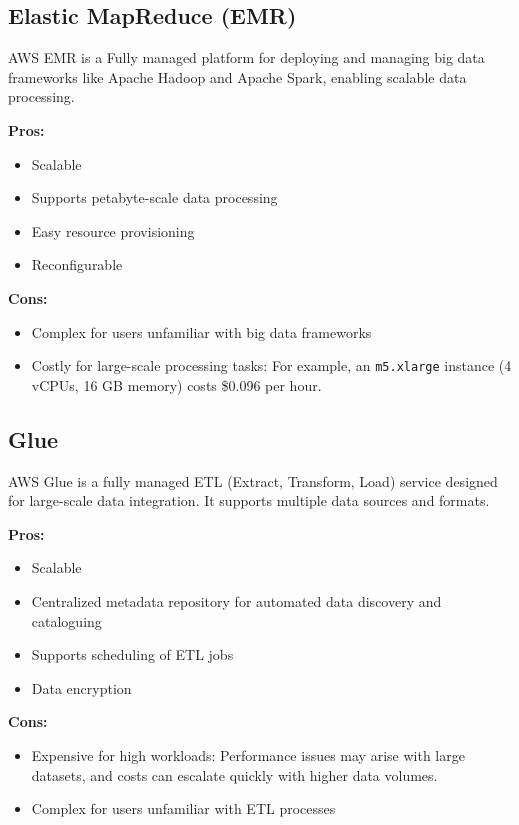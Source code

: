 \subsection*{Elastic MapReduce (EMR)}
\label{aws:emr}
AWS EMR is a Fully managed platform for deploying and managing big data frameworks like Apache Hadoop and Apache Spark, enabling scalable data processing.

\textbf{Pros:}
\begin{itemize}
    \item Scalable
    \item Supports petabyte-scale data processing
    \item Easy resource provisioning
    \item Reconfigurable
\end{itemize}

\textbf{Cons:}
\begin{itemize}
    \item Complex for users unfamiliar with big data frameworks
    \item Costly for large-scale processing tasks: For example, an \texttt{m5.xlarge} instance (4 vCPUs, 16 GB memory) costs \$0.096 per hour.
\end{itemize}

\subsection*{Glue}
\label{aws:glue}
AWS Glue is a fully managed ETL (Extract, Transform, Load) service designed for large-scale data integration. It supports multiple data sources and formats.

\textbf{Pros:}
\begin{itemize}
    \item Scalable
    \item Centralized metadata repository\cite{site:aws-glue-catalog} for automated data discovery and cataloguing
    \item Supports scheduling of ETL jobs
    \item Data encryption
\end{itemize}

\textbf{Cons:}
\begin{itemize}
    \item Expensive for high workloads: Performance issues may arise with large datasets, and costs can escalate quickly with higher data volumes.
    \item Complex for users unfamiliar with ETL processes
\end{itemize}


